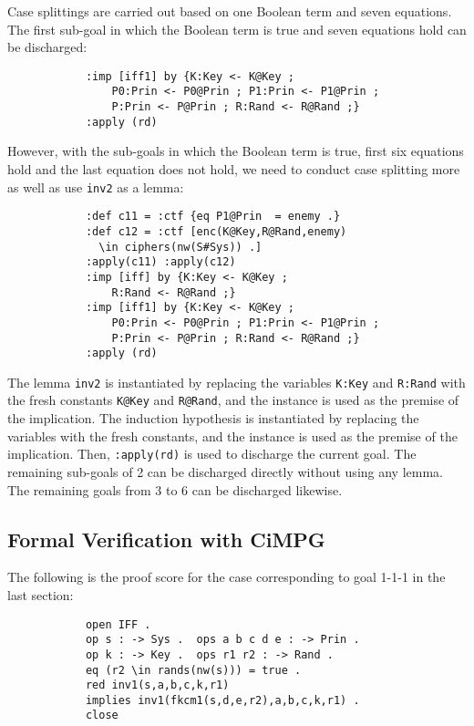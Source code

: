\documentclass[10pt, conference, compsocconf]{IEEEtran}
\begin{document}
	\noindent
	Case splittings are carried out based on one Boolean term and seven equations. 
	The first sub-goal in which the Boolean term is true and seven equations hold can be discharged:
	\begin{small}
		\begin{verbatim}
			:imp [iff1] by {K:Key <- K@Key ; 
				P0:Prin <- P0@Prin ; P1:Prin <- P1@Prin ; 
				P:Prin <- P@Prin ; R:Rand <- R@Rand ;}
			:apply (rd)
		\end{verbatim}
	\end{small}
	
	However, with the sub-goals in which the Boolean term is true, first six equations hold and the last equation does not hold, we need to conduct case splitting more as well as use \verb!inv2! as a lemma:
	
	\begin{small}
		\begin{verbatim}
			:def c11 = :ctf {eq P1@Prin  = enemy .}
			:def c12 = :ctf [enc(K@Key,R@Rand,enemy) 
			  \in ciphers(nw(S#Sys)) .]
			:apply(c11) :apply(c12)
			:imp [iff] by {K:Key <- K@Key ; 
				R:Rand <- R@Rand ;}
			:imp [iff1] by {K:Key <- K@Key ; 
				P0:Prin <- P0@Prin ; P1:Prin <- P1@Prin ; 
				P:Prin <- P@Prin ; R:Rand <- R@Rand ;}
			:apply (rd)
		\end{verbatim}
	\end{small}
	
	\noindent
	The lemma \verb!inv2! is instantiated by replacing the variables
	\verb!K:Key! and \verb!R:Rand! with the fresh constants \verb!K@Key!
	and \verb!R@Rand!, and the instance is used as the premise of the
	implication. The induction hypothesis is instantiated by
	replacing the variables with the
	fresh constants, and the instance is
	used as the premise of the implication. 
	Then, \verb!:apply(rd)! is
	used to discharge the current goal.
	The remaining sub-goals of 2 can be discharged directly without using any lemma.
	The remaining goals from 3 to 6 can be discharged likewise.
	
	\subsection{Formal Verification with CiMPG}
	The following is the proof score for the case corresponding to goal 1-1-1 in the last section:
	\begin{small}
		\begin{verbatim}
			open IFF .
			op s : -> Sys .  ops a b c d e : -> Prin .
			op k : -> Key .  ops r1 r2 : -> Rand .
			eq (r2 \in rands(nw(s))) = true .
			red inv1(s,a,b,c,k,r1) 
			implies inv1(fkcm1(s,d,e,r2),a,b,c,k,r1) .
			close
		\end{verbatim}
	\end{small}
	
\end{document}
